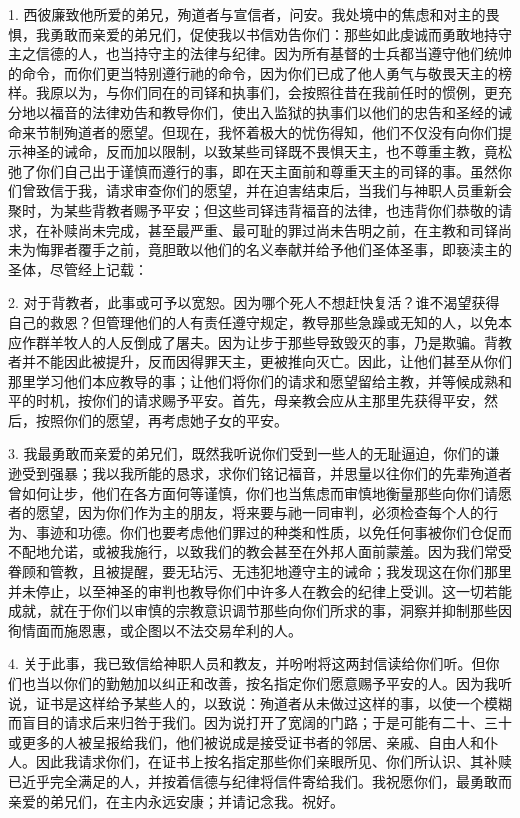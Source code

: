 1. 西彼廉致他所爱的弟兄，殉道者与宣信者，问安。我处境中的焦虑和对主的畏惧，我勇敢而亲爱的弟兄们，促使我以书信劝告你们：那些如此虔诚而勇敢地持守主之信德的人，也当持守主的法律与纪律。因为所有基督的士兵都当遵守他们统帅的命令，而你们更当特别遵行祂的命令，因为你们已成了他人勇气与敬畏天主的榜样。我原以为，与你们同在的司铎和执事们，会按照往昔在我前任时的惯例，更充分地以福音的法律劝告和教导你们，使出入监狱的执事们以他们的忠告和圣经的诫命来节制殉道者的愿望。但现在，我怀着极大的忧伤得知，他们不仅没有向你们提示神圣的诫命，反而加以限制，以致某些司铎既不畏惧天主，也不尊重主教，竟松弛了你们自己出于谨慎而遵行的事，即在天主面前和尊重天主的司铎的事。虽然你们曾致信于我，请求审查你们的愿望，并在迫害结束后，当我们与神职人员重新会聚时，为某些背教者赐予平安；但这些司铎违背福音的法律，也违背你们恭敬的请求，在补赎尚未完成，甚至最严重、最可耻的罪过尚未告明之前，在主教和司铎尚未为悔罪者覆手之前，竟胆敢以他们的名义奉献并给予他们圣体圣事，即亵渎主的圣体，尽管经上记载：\par

2. 对于背教者，此事或可予以宽恕。因为哪个死人不想赶快复活？谁不渴望获得自己的救恩？但管理他们的人有责任遵守规定，教导那些急躁或无知的人，以免本应作群羊牧人的人反倒成了屠夫。因为让步于那些导致毁灭的事，乃是欺骗。背教者并不能因此被提升，反而因得罪天主，更被推向灭亡。因此，让他们甚至从你们那里学习他们本应教导的事；让他们将你们的请求和愿望留给主教，并等候成熟和平的时机，按你们的请求赐予平安。首先，母亲教会应从主那里先获得平安，然后，按照你们的愿望，再考虑她子女的平安。\par

3. 我最勇敢而亲爱的弟兄们，既然我听说你们受到一些人的无耻逼迫，你们的谦逊受到强暴；我以我所能的恳求，求你们铭记福音，并思量以往你们的先辈殉道者曾如何让步，他们在各方面何等谨慎，你们也当焦虑而审慎地衡量那些向你们请愿者的愿望，因为你们作为主的朋友，将来要与祂一同审判，必须检查每个人的行为、事迹和功德。你们也要考虑他们罪过的种类和性质，以免任何事被你们仓促而不配地允诺，或被我施行，以致我们的教会甚至在外邦人面前蒙羞。因为我们常受眷顾和管教，且被提醒，要无玷污、无违犯地遵守主的诫命；我发现这在你们那里并未停止，以至神圣的审判也教导你们中许多人在教会的纪律上受训。这一切若能成就，就在于你们以审慎的宗教意识调节那些向你们所求的事，洞察并抑制那些因徇情面而施恩惠，或企图以不法交易牟利的人。\par

4. 关于此事，我已致信给神职人员和教友，并吩咐将这两封信读给你们听。但你们也当以你们的勤勉加以纠正和改善，按名指定你们愿意赐予平安的人。因为我听说，证书是这样给予某些人的，以致说：殉道者从未做过这样的事，以使一个模糊而盲目的请求后来归咎于我们。因为说打开了宽阔的门路；于是可能有二十、三十或更多的人被呈报给我们，他们被说成是接受证书者的邻居、亲戚、自由人和仆人。因此我请求你们，在证书上按名指定那些你们亲眼所见、你们所认识、其补赎已近乎完全满足的人，并按着信德与纪律将信件寄给我们。我祝愿你们，最勇敢而亲爱的弟兄们，在主内永远安康；并请记念我。祝好。\par


